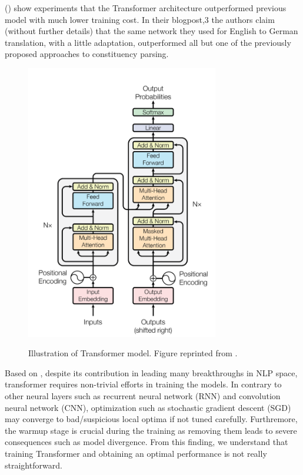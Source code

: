 (\cite{vaswani2017attention}) show experiments that the Transformer architecture outperformed previous model with much lower training cost. In their blogpost,3 the authors claim (without further details) that the same network they used for English to German translation, with a little adaptation, outperformed all but one of the previously proposed approaches to constituency parsing.

\begin{figure}[h]
    {\includegraphics[width=0.75\textwidth]{img/transformer.png}}
    \centering
    \caption{Illustration of Transformer model. Figure reprinted from \cite{vaswani2017attention}.}
    \label{img:transformer}
\end{figure}

Based on \cite{liu2020understanding}, despite its contribution in leading many breakthroughs in NLP space, transformer requires non-trivial efforts in training the models. In contrary to other neural layers such as recurrent neural network (RNN) and convolution neural network (CNN), optimization such as stochastic gradient descent (SGD) may converge to bad/suspicious local optima if not tuned carefully. Furthremore, the warmup stage is crucial during the training as removing them leads to severe consequences such as model divergence. From this finding, we understand that training Transformer and obtaining an optimal performance is not really straightforward.

